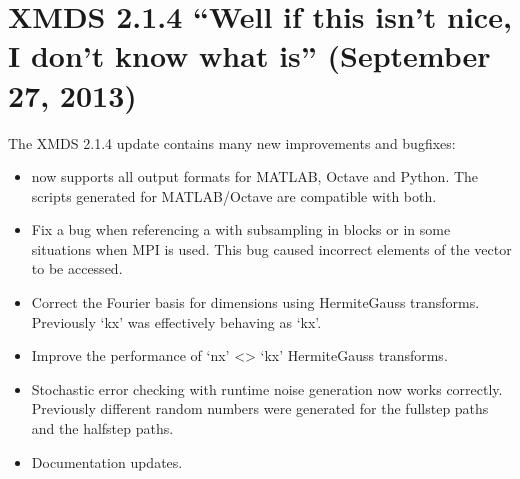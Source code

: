 \documentclass[letterpaper,10pt,english]{sphinxmanual}
\begin{document}
\section{XMDS 2.1.4 “Well if this isn’t nice, I don’t know what is” (September 27, 2013)}
\label{\detokenize{news:xmds-2-1-4-well-if-this-isn-t-nice-i-don-t-know-what-is-september-27-2013}}
\sphinxAtStartPar
The XMDS 2.1.4 update contains many new improvements and bugfixes:
\begin{itemize}
\item {} 
\sphinxAtStartPar
{} now supports all output formats for MATLAB, Octave and Python.  The scripts generated for MATLAB/Octave are compatible with both.

\item {} 
\sphinxAtStartPar
Fix a bug when {\hyperref[\detokenize{reference_elements:referencingnonlocal}]{}} referencing a {\hyperref[\detokenize{advanced_topics:dimensionaliases}]{}} with subsampling in  blocks or in some situations when MPI is used.  This bug caused incorrect elements of the vector to be accessed.

\item {} 
\sphinxAtStartPar
Correct the Fourier basis for dimensions using Hermite\sphinxhyphen{}Gauss transforms.  Previously ‘kx’ was effectively behaving as ‘\sphinxhyphen{}kx’.

\item {} 
\sphinxAtStartPar
Improve the performance of ‘nx’ \textless{}\textendash{}\textgreater{} ‘kx’ Hermite\sphinxhyphen{}Gauss transforms.

\item {} 
\sphinxAtStartPar
Stochastic error checking with runtime noise generation now works correctly.  Previously different random numbers were generated for the full\sphinxhyphen{}step paths and the half\sphinxhyphen{}step paths.

\item {} 
\sphinxAtStartPar
Documentation updates.

\end{itemize}
\end{document}
